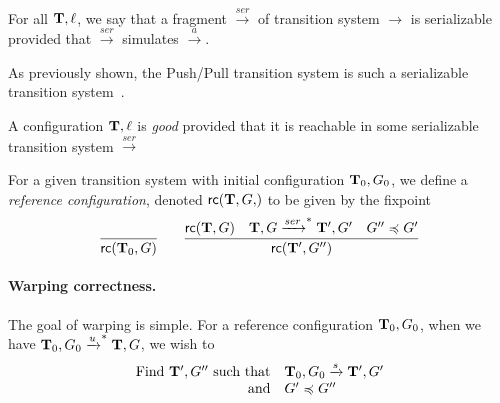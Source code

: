 



\bigskip
\bigskip
\bigskip
\bigskip
\bigskip
\bigskip
\bigskip
\bigskip


\begin{definition}
For all $\mathbf{T},\ell$, we say that a fragment 
$\xrightarrow{ser}$ of transition system $\xrightarrow{}$ is
serializable provided that 
$\xrightarrow{ser}$ simulates $\xrightarrow{a}$.
\end{definition}


As previously shown, the Push/Pull transition system is such a
serializable transition system~\cite{PMPY}.

\begin{definition}
A configuration $\mathbf{T},\ell$ is \emph{good} provided that it is reachable in
some serializable transition system $\xrightarrow{ser}$
\end{definition}


\newcommand\rc[2]{\textsf{rc}(#1,#2)}
\begin{definition}
For a given transition system with initial configuration $\mathbf{T}_0,G_0$,
we define a \emph{reference configuration}, denoted
$\rc{\Ts,G}$ to be given by the fixpoint
$$
\infer{\rc{\Ts_0}{G}}{}
\qquad
\infer{\rc{\Ts'}{G''}}{
   \rc{\Ts}{G}
&  \Ts,G \xrightarrow{ser}^{*} \Ts',G'
&  G'' \opeq G'
}
$$
\end{definition}

\paragraph{Warping correctness.} The goal of warping is simple. For a reference
configuration $\mathbf{T}_0,G_0$, when we have 
$\mathbf{T}_0,G_0 \xrightarrow{u}^{*} \mathbf{T},G$, we wish to
\[ \begin{array}{rl}
   \text{Find } \mathbf{T}',G'' \text{ such that}&
      \mathbf{T}_0,G_0 \xrightarrow{s} \mathbf{T}',G'\\
  \text{and}&G' \preccurlyeq G''
\end{array} \]

